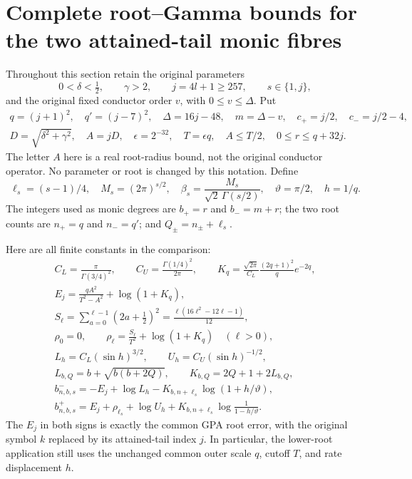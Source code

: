 
\section{Complete root--Gamma bounds for the two attained-tail monic fibres}
\label{sec:atgpa-audit}

Throughout this section retain the original parameters
\[
 0<\delta<\tfrac12,\qquad \gamma>2,\qquad
 j=4l+1\ge257,\qquad s\in\{1,j\},
\]
and the original fixed conductor order $v$, with
$0\le v\le\Delta$. Put
\[
\begin{gathered}
 q=(j+1)^2,\quad q'=(j-7)^2,\quad
 \Delta=16j-48,\quad m=\Delta-v,\quad
 c_+=j/2,\quad c_-=j/2-4,\\
 D=\sqrt{\delta^2+\gamma^2},\quad A=jD,\quad
 \epsilon=2^{-32},\quad T=\epsilon q,\quad
 A\le T/2,\quad 0\le r\le q+32j.
\end{gathered}\tag{ATG1}
\]
The letter $A$ here is a real root-radius bound, not the original
conductor operator. No parameter or root is changed by this notation.
Define
\[
 \ell_s=(s-1)/4,\quad M_s=(2\pi)^{s/2},\quad
 \beta_s=\frac{M_s}{\sqrt2\,\Gamma(s/2)},\quad
 \vartheta=\pi/2,\quad h=1/q.
\tag{ATG2}
\]
The integers used as monic degrees are $b_+=r$ and $b_-=m+r$;
the two root counts are $n_+=q$ and $n_-=q'$; and
$Q_\pm=n_\pm+\ell_s$.

Here are all finite constants in the comparison:
\[
\begin{gathered}
 C_L=\frac\pi{\Gamma(3/4)^2},\qquad
 C_U=\frac{\Gamma(1/4)^2}{2\pi},\qquad
 K_q=\frac{\sqrt{2\pi}}{C_L}\frac{(2q+1)^2}{q}e^{-2q},\\
 E_j=\frac{q A^2}{T^2-A^2}+\log(1+K_q),\\
 S_\ell=\sum_{a=0}^{\ell-1}(2a+\tfrac12)^2
       =\frac{\ell(16\ell^2-12\ell-1)}{12},\\
 \rho_0=0,\qquad
 \rho_\ell=\frac{S_\ell}{T^2}+\log(1+K_q)\quad(\ell>0),\\
 L_h=C_L(\sin h)^{3/2},\qquad U_h=C_U(\sin h)^{-1/2},\\
 L_{b,Q}=b+\sqrt{b(b+2Q)},\qquad
 K_{b,Q}=2Q+1+2L_{b,Q},\\
 b^-_{n,b,s}=-E_j+\log L_h
              -K_{b,n+\ell_s}\log(1+h/\vartheta),\\
 b^+_{n,b,s}=E_j+\rho_{\ell_s}+\log U_h
              +K_{b,n+\ell_s}\log\frac1{1-h/\vartheta}.
\end{gathered}\tag{ATG3}
\]
The $E_j$ in both signs is exactly the common GPA root error, with
the original symbol $k$ replaced by its attained-tail index $j$.
In particular, the lower-root application still uses the unchanged
common outer scale $q$, cutoff $T$, and rate displacement $h$.

